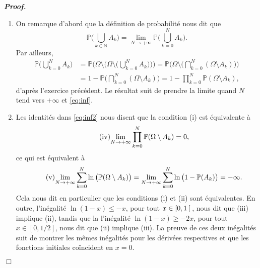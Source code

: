 \documentclass[11pt,a4paper]{article}
\newcommand{\NN}{\mathbb{N}}
\newenvironment{preuve}[1][]
{\vskip 2mm  \noindent\emph{\bf Proof#1. }}{$\Box$ \vskip 2mm}
\let\geq\geqslant
\let\leq\leqslant
\newcounter{exercice}
\begin{document}
		\begin{preuve}
			\begin{enumerate}
				\item On remarque d'abord que la définition de probabilité nous dit que 
				\begin{equation}
				\label{eq:inf}
				\mathbb{P}\bigg(\bigcup_{k\in \NN} A_k\bigg) = \underset{N \rightarrow +\infty}{\lim} \mathbb{P}\bigg(\bigcup_{k=0}^{N} A_k\bigg).
				\end{equation}         
				Par ailleurs, 
				\begin{equation}
				\label{eq:inf2}
				\begin{split}
				\mathbb{P}\bigg(\bigcup_{k=0}^{N} A_k\bigg) &= \mathbb{P}\bigg(\Omega \setminus \Big(\Omega \setminus \Big(\bigcup_{k=0}^{N} A_k\Big)\Big)\bigg) 
				= \mathbb{P}\bigg(\Omega \setminus \Big(\bigcap_{k=0}^{N} (\Omega \setminus A_k)\Big)\bigg) 
				\\
				&= 1 - \mathbb{P}\bigg(\bigcap_{k=0}^{N} (\Omega \setminus A_k)\bigg) = 1 - \prod_{k=0}^N \mathbb{P}(\Omega \setminus A_k),     
				\end{split}
				\end{equation} 
				d'après l'exercice précédent. 
				Le résultat suit de prendre la limite quand $N$ tend vers $+ \infty$ et \eqref{eq:inf}. 
				
				\item Les identités dans \eqref{eq:inf2} nous disent que la condition (i) est équivalente à 
				\begin{equation}
				\label{eq:inf3}
				\tag{$\mathrm{iv}$}
				\underset{N \rightarrow +\infty}{\lim} \prod_{k=0}^{N} \mathbb{P}(\Omega \setminus A_k) = 0,
				\end{equation} 
				ce qui est équivalent à 
				\begin{equation}
				\label{eq:inf4}
				\tag{$\mathrm{v}$}
				\underset{N \rightarrow +\infty}{\lim} \sum_{k=0}^{N} \ln\big(\mathbb{P}(\Omega \setminus A_k)\big) = \underset{N \rightarrow +\infty}{\lim} \sum_{k=0}^{N} \ln\big(1 - \mathbb{P}(A_k)\big) = - \infty.
				\end{equation} 
				Cela nous dit en particulier que les conditions (i) et (ii) sont équivalentes. 
				En outre, l'inégalité $\ln(1-x) \leq -x$, pour tout $x \in [0,1 \hskip 0.6mm [ \hskip 0.6mm$, nous dit que (iii) implique (ii), tandis que la 
				l'inégalité $\ln(1-x) \geq -2 x$, pour tout $x \in [0,1/2]$, nous dit que (ii) implique (iii). 
				La preuve de ces deux inégalités suit de montrer les mêmes inégalités pour les dérivées respectives et que les fonctions initiales coïncident en $x = 0$. 
			\end{enumerate}  
		\end{preuve}
		
\end{document}
